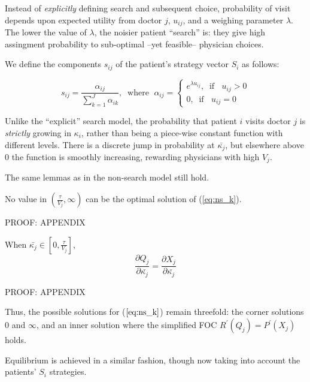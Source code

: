 \documentclass[../main.tex]{subfiles}
\begin{document}
Instead of \textit{explicitly} defining search and subsequent choice, probability of visit depends upon expected utility from doctor $j$, $u_{ij}$, and a weighing parameter $\lambda$. The lower the value of $\lambda$, the noisier patient ``search'' is: they give high assingment probability to sub-optimal --yet feasible-- physician choices.

We define the components $s_{ij}$ of the patient's strategy vector $S_i$ as follows:

\begin{equation}
s_{ij} = \frac{\alpha_{ij}}{\sum_{k = 1}^{J} \alpha_{ik}}, \; \; \text{where } \; \alpha_{ij} = \begin{cases}
e^{\lambda u_{ij}}, \; \; \text{if } \; \; u_{ij} > 0 \\
0 , \; \; \text{if } \; \; u_{ij} = 0
\end{cases}
\label{eq:is_s}
\tag{S}
\end{equation}

Unlike the ``explicit'' search model, the probability that patient $i$ visits doctor $j$ is \textit{strictly} growing in $\kappa_i$, rather than being a piece-wise constant function with different levels. There is a discrete jump in probability at $\bar{\kappa_j}$, but elsewhere above $0$ the function is smoothly increasing, rewarding physicians with high $V_j$.

The same lemmas as in the non-search model still hold.


\begin{lemma}
\label{is_lemma}
No value in $(\frac{\tau}{V_j},\infty)$ can be the optimal solution of (\ref{eq:ns_k}).
\end{lemma}
    
    PROOF: APPENDIX
    
\begin{lemma}
\label{is_derivatives}
When $\bar{\kappa_j} \in [0,\frac{\tau}{V_j}]$,
\[
\frac{\partial Q_j}{\partial\bar{\kappa_j}} = \frac{\partial X_j}{\partial \bar{\kappa_j}}   
\]
\end{lemma}
    
PROOF: APPENDIX

Thus, the possible solutions for ($\ref{eq:ns_k}$) remain threefold: the corner solutions $0$ and $\infty$, and an inner solution where the simplified FOC $R^{\prime}(Q_j) = P^{\prime}(X_j)$ holds.

Equilibrium is achieved in a similar fashion, though now taking into account the patients' $S_i$ strategies.
\end{document}
